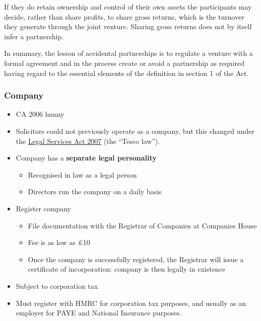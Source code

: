 \documentclass[
]{article}
\providecommand{\tightlist}{%
  \setlength{\itemsep}{0pt}\setlength{\parskip}{0pt}}
\begin{document}
If they do retain ownership and control of their own assets the
participants may decide, rather than share profits, to share gross
returns, which is the turnover they generate through the joint venture.
Sharing gross returns does not by itself infer a partnership.

In summary, the lesson of accidental partnerships is to regulate a
venture with a formal agreement and in the process create or avoid a
partnership as required having regard to the essential elements of the
definition in section 1 of the Act.

\hypertarget{company}{%
\subsubsection{Company}\label{company}}

\begin{itemize}
\tightlist
\item
  CA 2006 hunny
\item
  Solicitors could not previously operate as a company, but this changed
  under the
  \href{https://www.legislation.gov.uk/ukpga/2007/29/contents}{Legal
  Services Act 2007} (the ``Tesco law'').
\item
  Company has a \textbf{separate legal personality}

  \begin{itemize}
  \tightlist
  \item
    Recognised in law as a legal person
  \item
    Directors run the company on a daily basis
  \end{itemize}
\item
  Register company

  \begin{itemize}
  \tightlist
  \item
    File documentation with the Registrar of Companies at Companies
    House
  \item
    Fee is as low as £10
  \item
    Once the company is successfully registered, the Registrar will
    issue a certificate of incorporation: company is then legally in
    existence
  \end{itemize}
\item
  Subject to corporation tax
\item
  Must register with HMRC for corporation tax purposes, and usually as
  an employer for PAYE and National Insurance purposes.
\end{itemize}
\end{document}

